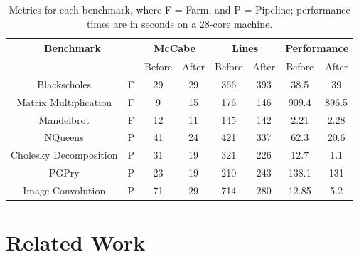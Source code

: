 
\begin{table}
	\begin{tabular}{|c|c|c|c|c|c|c|c|}
		\hline \hline
		\multicolumn{2}{|c|}{\textbf{Benchmark}} & \multicolumn{2}{|c|}{McCabe} & \multicolumn{2}{|c|}{Lines} & \multicolumn{2}{|c|}{Performance}  \\
		\hline
		& & Before & After & Before & After & Before & After  \\
		\hline
		Blackscholes & F &  29 & 29 & 366 & 393 & 38.5 & 39  \\
		Matrix Multiplication & F & 9 & 15 & 176 & 146 & 909.4 & 896.5  \\
		Mandelbrot & F  & 12 & 11 & 145 & 142 & 2.21 & 2.28 \\
		NQueens & P & 41 & 24 & 421 & 337 & 62.3 & 20.6  \\
		Cholesky Decomposition & P & 31  & 19 & 321 & 226 & 12.7 & 1.1 \\
		PGPry & P & 23 & 19 & 210 & 243 & 138.1 & 131 \\
		Image Convolution & P & 71 & 29 & 714 & 280 & 12.85  & 5.2 \\
		\hline \hline
	\end{tabular}
	\caption{Metrics for each benchmark, where F = Farm, and P = Pipeline; performance times are in seconds on a 28-core machine.}
	\label{fig:benchmarks2}
\end{table}

\section{Related Work}

